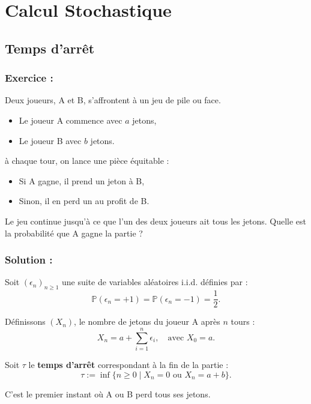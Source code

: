 \chapter{Calcul Stochastique}

\section{Temps d'arrêt}

\subsection*{Exercice :}

\begin{exerciseBox}
Deux joueurs, A et B, s'affrontent à un jeu de pile ou face.  
\begin{itemize}
    \item Le joueur A commence avec $a$ jetons,  
    \item  Le joueur B avec $b$ jetons.  
\end{itemize}

à chaque tour, on lance une pièce équitable :  
\begin{itemize}
    \item  Si A gagne, il prend un jeton à B,  
    \item Sinon, il en perd un au profit de B.  
\end{itemize}

Le jeu continue jusqu’à ce que l’un des deux joueurs ait tous les jetons.  
Quelle est la probabilité que A gagne la partie ?    
\end{exerciseBox}

\subsection*{Solution :}

Soit $(\epsilon_n)_{n \geq 1}$ une suite de variables aléatoires i.i.d. définies par :
\[
\mathbb{P}(\epsilon_n = +1) = \mathbb{P}(\epsilon_n = -1) = \frac{1}{2}.
\]

Définissons $(X_n)$, le nombre de jetons du joueur A après $n$ tours :
\[
X_n = a + \sum_{i=1}^n \epsilon_i, \quad \text{avec } X_0 = a.
\]

Soit $\tau$ le \textbf{temps d'arrêt} correspondant à la fin de la partie :
\[
\tau := \inf \{ n \geq 0 \mid X_n = 0 \text{ ou } X_n = a + b \}.
\]

C’est le premier instant où A ou B perd tous ses jetons.


